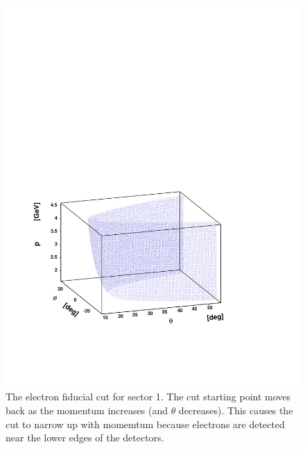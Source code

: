 \begin{figure}[h]
 \begin{center}
 \includegraphics[width = 12cm, bb=20 120 480 480]{data_reduction/img/electron_tphp} 
  \caption[The electron fiducial cut for sector 1]
          { The electron fiducial cut for sector 1. The cut starting point moves back
	             as the momentum increases (and $\theta$ decreases). 
		     This causes the cut to narrow up with momemtum because electrons are detected 
		     near the lower edges of the detectors. }
 \label{fig:fidu_e3d}
 \end{center}
\end{figure}

\cia
